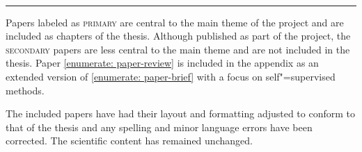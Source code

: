 \vspace{5mm}

\raggedright\par\noindent\hspace{8mm}{\Large\scshape secondary}\\[-2mm]

\raggedleft\rule{\textwidth - 8mm}{0.4pt}

\begin{enumerate}[leftmargin=8mm,topsep=0mm,label={[\Alph*]}]
    \setcounter{enumi}{3}
    \item {} \shared \label{enumerate: paper-review}
    \item {} \co
    \item {} \co %
\end{enumerate}

\justifying

\vspace{5mm}

\noindent Papers labeled as \textsc{primary} are central to the main theme of the project and are included as chapters of the thesis. 
Although published as part of the project, the \textsc{secondary} papers are less central to the main theme and are not included in the thesis. 
Paper \ref{enumerate: paper-review} is included in the appendix as an extended version of \ref{enumerate: paper-brief} with a focus on self"=supervised methods. 

\vspace{3mm}

\noindent The included papers have had their layout and formatting adjusted to conform to that of the thesis and any spelling and minor language errors have been corrected. The scientific content has remained unchanged.

\vspace*{\fill}
